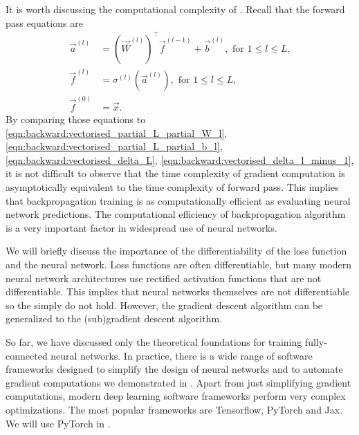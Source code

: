 \begin{remark}
It is worth discussing the computational complexity of  . Recall that the forward pass equations are
\begin{align*}
    \vec{a}^{(l)} &= (\vec{W}^{(l)})^{\top} \vec{f}^{(l - 1)} + \vec{b}^{(l)}, \text{ for $1 \leq l \leq L$,} \\
    \vec{f}^{(l)} &= \sigma ^{(l)}(\vec{a}^{(l)}),  \text{ for $1 \leq l \leq L$,} \\
    \vec{f}^{(0)} &= \vec{x}.
\end{align*}
By comparing those equations to \ref{eqn:backward:vectorised_partial_L_partial_W_l}, \ref{eqn:backward:vectorised_partial_L_partial_b_l},  \ref{eqn:backward:vectorised_delta_L}, \ref{eqn:backward:vectorised_delta_l_minus_1}, it is not difficult to observe that the time complexity of gradient computation is asymptotically equivalent to the time complexity of forward pass. This implies that backpropagation training is as computationally efficient as evaluating neural network predictions. The computational efficiency of backpropagation algorithm is a very important factor in widespread use of neural networks.
\end{remark}

\begin{remark}
We will briefly discuss the importance of the differentiability of the loss function and the neural network. Loss functions are often differentiable, but many modern neural network architectures use rectified activation functions that are not differentiable. This implies that neural networks themselves are not differentiable so the  simply do not hold. However, the gradient descent algorithm can be generalized to the (sub)gradient descent algorithm.
\end{remark}

\begin{remark}
So far, we have discussed only the theoretical foundations for training fully-connected neural networks.
In practice, there is a wide range of software frameworks designed to simplify the design of neural networks and to automate gradient computations we demonstrated in . Apart from just simplifying gradient computations, modern deep learning software frameworks perform very complex optimizations. The most popular frameworks are Tensorflow\cite{tensorflow2015-whitepaper}, PyTorch \cite{paszke_2019_pytorch} and Jax\cite{jax2018github}. 
We will use PyTorch in .
\end{remark}